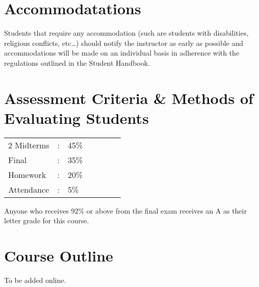 \documentclass[handout]{ximera}
\begin{document}
\section*{Accommodatations}

Students that require any accommodation (such are students with disabilities, religious conflicts, etc…) should notify the instructor as early as possible and accommodations will be made on an individual basis in adherence with the regulations outlined in the Student Handbook.

\section*{Assessment Criteria \& Methods of Evaluating Students}

\begin{tabular}[c]{lllcccl}
2 Midterms  & : & 45\% & \,\hspace{2cm} &  & & \\  
Final & : & 35\% & \hspace{2cm} & & & \\  
Homework & : & 20\% & \hspace{2cm} & & & \\  
Attendance & : & 5\% & \hspace{2cm} & &  & \\  
\end{tabular}

Anyone who receives 92\% or above from the final exam receives an A as their letter grade for this course.

\section*{Course Outline}

To be added online.


\end{document}
